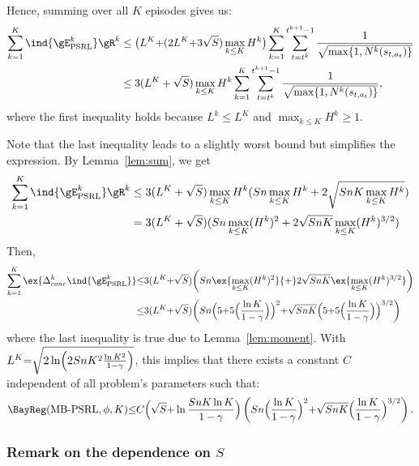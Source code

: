 \begin{subappendices}
\begin{align}
\end{align}
Hence, summing over all $K$ episodes gives us:
\begin{align}
    \sum_{k=1}^{K} \ind{\gE^{k}_\text{PSRL}}\gR^k
    &\le  \big(L^K {+}(2L^K {+}3\sqrt{S})\max_{k\le K}H^k\big)\sum_{k=1}^K \sum_{t=t^k}^{t^{k+1}-1}\frac1{\sqrt{\max\{1,N^{k}(s_{t,a_t})\} }}
    \nonumber\\
    &\le  3(L^K+\sqrt{S})\max_{k\le K}H^k \sum_{k=1}^K \sum_{t=t^k}^{t^{k+1}-1}\frac1{\sqrt{\max\{1,N^{k}(s_{t,a_t})\} }},
    \label{eq:sum_not_E_k}
\end{align}
where the first inequality holds because $L^k\le L^K$ and $\max_{k\le K}H^k\ge1$.

Note that the last inequality leads to a slightly worst bound but simplifies the expression. By Lemma~\ref{lem:sum}, we get
\begin{align*}
    \sum_{k=1}^{K} \ind{\gE^{k}_\text{PSRL}}\gR^k
    &\le 3(L^K+\sqrt{S})\max_{k\le K}H^k(Sn\max_{k\le K}H^k +2\sqrt{SnK \max_{k\le K}H^k}) \\
    &=3(L^K+\sqrt{S})(Sn\max_{k\le K}(H^k)^2 +2\sqrt{SnK} \max_{k\le K}(H^k)^{3/2})
    \nonumber
\end{align*}
Then, 
\begin{align}
    \sum_{k=1}^K\ex{\Delta^k_{conc} \ind{\gE^{k}_\text{PSRL}}}
    &{\le} 3(L^K {+}\sqrt{S})\bigg(Sn\ex{\max_{k\le K}(H^k)^2} {+}2\sqrt{SnK} \ex{\max_{k\le K}(H^k)^{3/2}}\bigg) \label{eq:proof_bound}\\
    &{\le} 3(L^K {+}\sqrt{S})\bigg(Sn\Bigl(5 {+}5\Bigl(\frac{\ln K}{1-\gamma}\Bigr)\Bigr)^2 {+}\sqrt{SnK}\Bigl(5 {+}5\Bigl(\frac{\ln K}{1-\gamma}\Bigr)\Bigr)^{3/2}\bigg) \nonumber
\end{align}
where the last inequality is true due to Lemma~\ref{lem:moment}.
With $L^K{=}\sqrt{2\ln\Bigl(2SnK^2\frac{\ln K^2}{1-\gamma}\Bigr)}$, this implies that there exists a constant $C$ independent of all problem's parameters such that:
\begin{align*}
    \BayReg(\textnormal{MB-PSRL},\phi,K) {\le} C\Bigl(\sqrt{S}{+}\ln \frac{SnK\ln K}{1-\gamma}\Bigr) \left(Sn\Bigl(\frac{\ln K}{1-\gamma}\Bigr)^{2}
    {+}\sqrt{SnK}\Bigl(\frac{\ln K}{1-\gamma}\Bigr)^{3/2}\right).
\end{align*}

\subsubsection{Remark on the dependence on \texorpdfstring{$S$}{}}
\label{sssec:psrl_s}


\end{subappendices}

